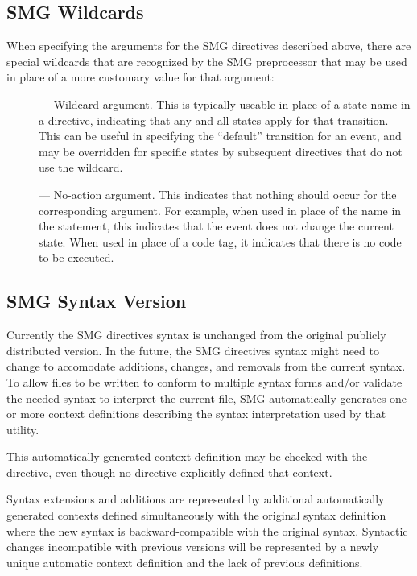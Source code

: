 \subsection{SMG Wildcards}

When specifying the arguments for the SMG directives described above,
there are special wildcards that are recognized by the SMG
preprocessor that may be used in place of a more customary value for
that argument:

\begin{description}
  
\item[\smg{*}] --- Wildcard argument.  This is typically useable in
  place of a state name in a \TRANS directive, indicating that any and
  all states apply for that transition.  This can be useful in
  specifying the ``default'' transition for an event, and may be
  overridden for specific states by subsequent \TRANS directives that
  do not use the wildcard.
  
\item[\smg{--}] --- No-action argument.  This indicates that nothing
  should occur for the corresponding argument.  For example, when used
  in place of the  name in the \TRANS statement,
  this indicates that the event does not change the current state.
  When used in place of a code tag, it indicates that there is no code
  to be executed.

\end{description}

\subsection{SMG Syntax Version}

Currently the SMG directives syntax is unchanged from the original
publicly distributed version.  In the future, the SMG directives
syntax might need to change to accomodate additions, changes, and
removals from the current syntax.  To allow  files to be
written to conform to multiple syntax forms and/or validate the needed
syntax to interpret the current file, SMG automatically generates one
or more context definitions describing the syntax interpretation used
by that  utility.

This automatically generated context definition may be checked with
the \SMIF directive, even though no \SMDEF directive explicitly
defined that context.

Syntax extensions and additions are represented by additional
automatically generated contexts defined simultaneously with the
original syntax definition where the new syntax is backward-compatible
with the original syntax.  Syntactic changes incompatible with
previous versions will be represented by a newly unique automatic
context definition and the lack of previous definitions.


